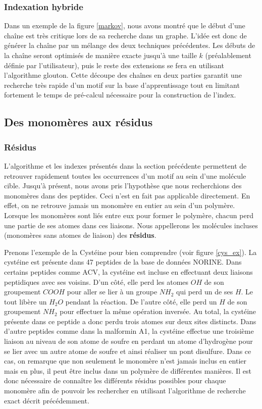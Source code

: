 \subsubsection{Indexation hybride}

Dans un exemple de la figure \ref{markov}, nous avons montré que le début d'une chaîne est très critique lors de sa recherche dans un graphe.
L'idée est donc de générer la chaîne par un mélange des deux techniques précédentes.
Les débuts de la chaîne seront optimisés de manière exacte jusqu'à une taille $k$ (préalablement définie par l'utilisateur), puis le reste des extensions se fera en utilisant l'algorithme glouton.
Cette découpe des chaînes en deux parties garantit une recherche très rapide d'un motif sur la base d'apprentissage tout en limitant fortement le temps de pré-calcul nécessaire pour la construction de l'index.



\subsection{Des monomères aux résidus}
\label{families}


\subsubsection{Résidus}

L'algorithme et les indexes présentés dans la section précédente permettent de retrouver rapidement toutes les occurrences d'un motif au sein d'une molécule cible.
Jusqu'à présent, nous avons pris l'hypothèse que nous recherchions des monomères dans des peptides.
Ceci n'est en fait pas applicable directement.
En effet, on ne retrouve jamais un monomère en entier au sein d'un polymère.
Lorsque les monomères sont liés entre eux pour former le polymère, chacun perd une partie de ses atomes dans ces liaisons.
Nous appellerons les molécules incluses (monomères sans atomes de liaison) des \textbf{résidus}.

Prenons l'exemple de la Cystéine pour bien comprendre (voir figure \ref{cys_ex}).
La cystéine est présente dans 47 peptides de la base de données NORINE.
Dans certains peptides comme ACV, la cystéine est incluse en effectuant deux liaisons peptidiques avec ses voisins.
D'un côté, elle perd les atomes $OH$ de son groupement $COOH$ pour aller se lier à un groupe $NH_2$ qui perd un de ses $H$. 
Le tout libère un $H_2O$ pendant la réaction.
De l'autre côté, elle perd un $H$ de son groupement $NH_2$ pour effectuer la même opération inversée.
Au total, la cystéine présente dans ce peptide a donc perdu trois atomes sur deux sites distincts.
Dans d'autre peptides comme dans la malformin A1, la cystéine effectue une troisième liaison au niveau de son atome de soufre en perdant un atome d'hydrogène pour se lier avec un autre atome de soufre et ainsi réaliser un pont disulfure.
Dans ce cas, on remarque que non seulement le monomère n'est jamais inclus en entier mais en plus, il peut être inclus dans un polymère de différentes manières.
Il est donc nécessaire de connaître les différents résidus possibles pour chaque monomère afin de pouvoir les rechercher en utilisant l'algorithme de recherche exact décrit précédemment.

